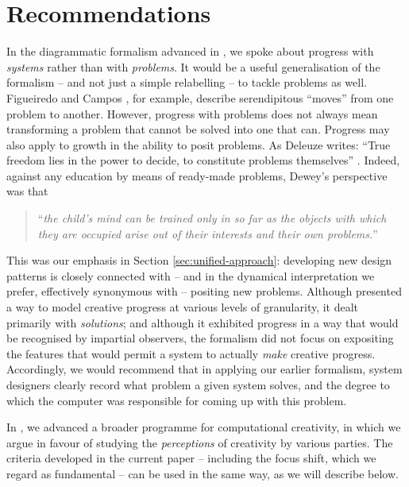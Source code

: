 \section{Recommendations} \label{sec:recommendations}

In the diagrammatic formalism advanced in
\cite{colton-assessingprogress}, we spoke about progress with
\emph{systems} rather than with \emph{problems}.  It would be a useful
generalisation of the formalism -- and not just a simple relabelling
-- to tackle problems as well.
%
Figueiredo and Campos \cite{Figueiredo2001}, for example, describe
serendipitous ``moves'' from one problem to another.
%
However, progress with problems does not always mean transforming a
problem that cannot be solved into one that can.  Progress may also
apply to growth in the ability to posit problems.  As Deleuze writes:
``True freedom lies in the power to decide, to constitute problems
themselves'' \cite[p. 15]{deleuze1991bergsonism}.  Indeed, against any
education by means of ready-made problems, Dewey's perspective was
that
\begin{quote}
``\emph{the child's mind can be trained only in so far as the objects
    with which they are occupied arise out of their interests and
    their own problems.}''~\cite{dewey-by-mead}
\end{quote}

This was our emphasis in Section \ref{sec:unified-approach}:
developing new design patterns is closely connected with -- and in the
dynamical interpretation we prefer, effectively synonymous with --
positing new problems.  Although \cite{colton-assessingprogress}
presented a way to model creative progress at various levels of
granularity, it dealt primarily with \emph{solutions}; and although it
exhibited progress in a way that would be recognised by impartial
observers, the formalism did not focus on expositing the features that
would permit a system to actually \emph{make} creative progress.
Accordingly, we would recommend that in applying our earlier
formalism, system designers clearly record what problem a given system
solves, and the degree to which the computer was responsible for
coming up with this problem.

In \cite{stakeholder-groups-bookchapter}, we advanced a broader
programme for computational creativity, in which we argue in favour of
studying the \emph{perceptions} of creativity by various parties.  The
criteria developed in the current paper -- including the focus shift,
which we regard as fundamental -- can be used in the same way, as we
will describe below.

